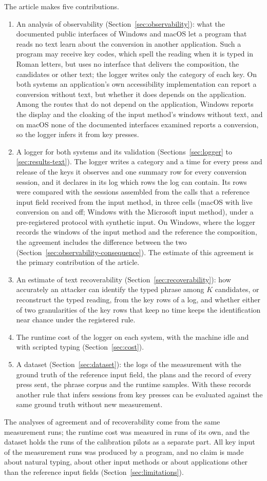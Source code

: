 The article makes five contributions.
\begin{enumerate}
\item An analysis of observability (Section~\ref{sec:observability}): what the documented public interfaces of
Windows and macOS let a program that reads no text learn about the conversion in another application. Such a program
may receive key codes, which spell the reading when it is typed in Roman letters, but uses no interface that delivers
the composition, the candidates or other text; the logger writes only the category of each key. On both systems an
application's own accessibility implementation can report a conversion without text, but whether it does depends on the
application. Among the routes that do not depend on the application, Windows reports the display and the cloaking of
the input method's windows without text, and on macOS none of the documented interfaces examined reports a conversion,
so the logger infers it from key presses.
\item A logger for both systems and its validation (Sections~\ref{sec:logger} to \ref{sec:results-text}). The logger
writes a category and a time for every press and release of the keys it observes and one summary row for every
conversion session, and it declares in its log which rows the log can contain. Its rows were compared with the
sessions assembled from the calls that a reference input field received from the input method, in three cells (macOS
with live conversion on and off; Windows with the Microsoft input method), under a pre-registered protocol with
synthetic input. On Windows, where the logger records the windows of the input method and the reference the
composition, the agreement includes the difference between the two (Section~\ref{sec:observability-consequence}). The
estimate of this agreement is the primary contribution of the article.
\item An estimate of text recoverability (Section~\ref{sec:recoverability}): how accurately an attacker can identify
the typed phrase among $K$ candidates, or reconstruct the typed reading, from the key rows of a log, and whether either
of two granularities of the key rows that keep no time keeps the identification near chance under the registered rule.
\item The runtime cost of the logger on each system, with the machine idle and with scripted typing
(Section~\ref{sec:cost}).
\item A dataset (Section~\ref{sec:dataset}): the logs of the measurement with the ground truth of the reference input
field, the plans and the record of every press sent, the phrase corpus and the runtime samples. With these records
another rule that infers sessions from key presses can be evaluated against the same ground truth without new
measurement.
\end{enumerate}

The analyses of agreement and of recoverability come from the same measurement runs; the runtime cost was measured in
runs of its own, and the dataset holds the runs of the calibration pilots as a separate part. All key input of the
measurement runs was produced by a program, and no claim is made about natural typing, about other input methods or
about applications other than the reference input fields (Section~\ref{sec:limitations}).
